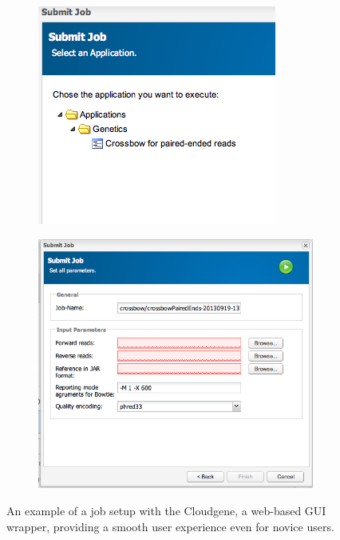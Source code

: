 \documentclass{article}
\begin{document}
\begin{center}
	\begin{figure}[htbp] %
		\begin{subfigure}[b]{0.6\textwidth}
		   \includegraphics[width=\textwidth]{a.png} 
		\end{subfigure}
		\begin{subfigure}[b]{0.6\textwidth}
		   \includegraphics[width=\textwidth]{b.png} 
		\end{subfigure}
		\caption{An example of a job setup with the Cloudgene, a web-based GUI wrapper, providing a smooth user experience even for novice users.}
		\label{fig:fig5}
	\end{figure}
\end{center}
\end{document}

